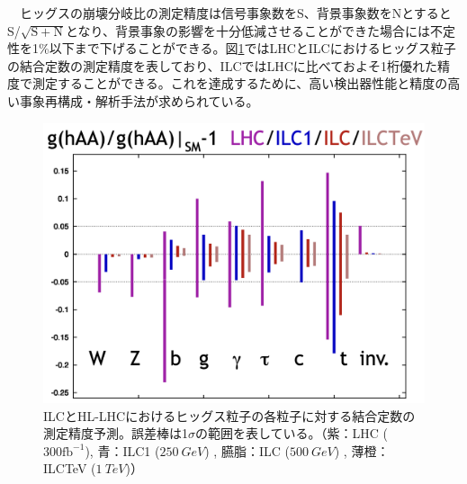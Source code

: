 　ヒッグスの崩壊分岐比の測定精度は信号事象数をS、背景事象数をNとするとS/$\mathrm{\sqrt{S+N}}$となり、背景事象の影響を十分低減させることができた場合には不定性を1\%以下まで下げることができる。図\ref{lhcvsilc}ではLHCとILCにおけるヒッグス粒子の結合定数の測定精度を表しており、ILCではLHCに比べておよそ1桁優れた精度で測定することができる。これを達成するために、高い検出器性能と精度の高い事象再構成・解析手法が求められている。
\begin{figure}[H]
	\begin{center}
 \includegraphics[keepaspectratio, scale=0.3]
 	{Figure/Introduction/lhcvsilc.png}
 		\caption[ヒッグスの結合定数精度におけるILCとHL-LHCの比較]{ILCとHL-LHCにおけるヒッグス粒子の各粒子に対する結合定数の測定精度予測。誤差棒は1$\sigma$の範囲を表している。（紫：LHC ($300 \mathrm{fb^{-1}}$), 青：ILC1 ($\SI{250}{GeV}$) , 臙脂：ILC ($\SI{500}{GeV}$) , 薄橙：ILCTeV ($\SI{1}{TeV}$)）~\cite{decaybsm}}
 		\label{lhcvsilc}
	\end{center}
\end{figure}

